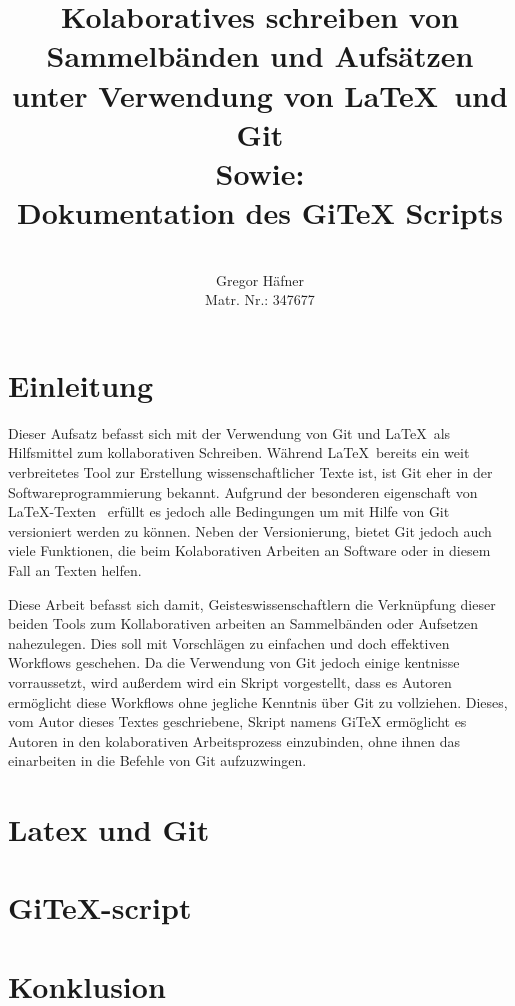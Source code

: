 \documentclass[12pt,a4paper]{scrartcl}
\author{\\ Gregor Häfner \\
{\small Matr. Nr.: 347677} }
\title{Kolaboratives schreiben von Sammelbänden und Aufsätzen unter Verwendung von \LaTeX ~und Git \bigskip \\ Sowie: \\ Dokumentation des GiTeX Scripts}
\begin{document}
\maketitle
\bigskip
\tableofcontents
\pagebreak

\section{Einleitung}

Dieser Aufsatz befasst sich mit der Verwendung von Git und \LaTeX \ als Hilfsmittel zum kollaborativen Schreiben. Während \LaTeX \ bereits ein weit verbreitetes Tool zur Erstellung wissenschaftlicher Texte ist, ist Git eher in der Softwareprogrammierung bekannt. Aufgrund der besonderen eigenschaft von \LaTeX -Texten \ erfüllt es jedoch alle Bedingungen um mit Hilfe von Git versioniert werden zu können. Neben der Versionierung, bietet Git jedoch auch viele Funktionen, die beim Kolaborativen Arbeiten an Software oder in diesem Fall an Texten helfen.

 Diese Arbeit befasst sich damit, Geisteswissenschaftlern die Verknüpfung dieser beiden Tools zum Kollaborativen arbeiten an Sammelbänden oder Aufsetzen nahezulegen. Dies soll mit Vorschlägen zu einfachen und doch effektiven Workflows geschehen. Da die Verwendung von Git jedoch einige kentnisse vorraussetzt, wird außerdem wird ein Skript vorgestellt, dass es Autoren ermöglicht diese Workflows ohne jegliche Kenntnis über Git zu vollziehen. Dieses, vom Autor dieses Textes geschriebene, Skript namens GiTeX ermöglicht es Autoren in den kolaborativen Arbeitsprozess einzubinden, ohne ihnen das einarbeiten in die Befehle von Git aufzuzwingen.

\section{Latex und Git}



\section{GiTeX-script}



\section{Konklusion}
\end{document}
